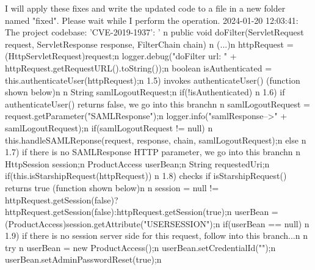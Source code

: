 \markdownRendererUlEndTight \markdownRendererInterblockSeparator
{}I will apply these fixes and write the updated code to a file in a new folder named "fixed". Please wait while I perform the operation. 2024-01-20 12:03:41: The project codebase: \markdownRendererLeftBrace{}'CVE-2019-1937': ' \markdownRendererBackslash{}n public void doFilter(ServletRequest request, ServletResponse response, FilterChain chain) \markdownRendererLeftBrace{}\markdownRendererBackslash{}n (...)\markdownRendererBackslash{}n httpRequest = (HttpServletRequest)request;\markdownRendererBackslash{}n logger.debug("doFilter url: " + httpRequest.getRequestURL().toString());\markdownRendererBackslash{}n boolean isAuthenticated = this.authenticateUser(httpRequest);\markdownRendererBackslash{}n \markdownRendererCircumflex{}\markdownRendererCircumflex{}\markdownRendererCircumflex{} 1.5) invokes authenticateUser() (function shown below)\markdownRendererBackslash{}n \markdownRendererBackslash{}n String samlLogoutRequest;\markdownRendererBackslash{}n if(!isAuthenticated) \markdownRendererLeftBrace{}\markdownRendererBackslash{}n \markdownRendererCircumflex{}\markdownRendererCircumflex{}\markdownRendererCircumflex{} 1.6) if authenticateUser() returns false, we go into this branch\markdownRendererBackslash{}n \markdownRendererBackslash{}n samlLogoutRequest = request.getParameter("SAMLResponse");\markdownRendererBackslash{}n logger.info("samlResponse-->" + samlLogoutRequest);\markdownRendererBackslash{}n if(samlLogoutRequest != null) \markdownRendererLeftBrace{}\markdownRendererBackslash{}n this.handleSAMLReponse(request, response, chain, samlLogoutRequest);\markdownRendererBackslash{}n \markdownRendererRightBrace{} else \markdownRendererLeftBrace{}\markdownRendererBackslash{}n \markdownRendererCircumflex{}\markdownRendererCircumflex{}\markdownRendererCircumflex{} 1.7) if there is no SAMLResponse HTTP parameter, we go into this branch\markdownRendererBackslash{}n \markdownRendererBackslash{}n HttpSession session;\markdownRendererBackslash{}n ProductAccess userBean;\markdownRendererBackslash{}n String requestedUri;\markdownRendererBackslash{}n if(this.isStarshipRequest(httpRequest)) \markdownRendererLeftBrace{}\markdownRendererBackslash{}n \markdownRendererCircumflex{}\markdownRendererCircumflex{}\markdownRendererCircumflex{} 1.8) checks if isStarshipRequest() returns true (function shown below)\markdownRendererBackslash{}n \markdownRendererBackslash{}n session = null != httpRequest.getSession(false)?httpRequest.getSession(false):httpRequest.getSession(true);\markdownRendererBackslash{}n userBean = (ProductAccess)session.getAttribute("USERSESSION");\markdownRendererBackslash{}n if(userBean == null) \markdownRendererLeftBrace{}\markdownRendererBackslash{}n \markdownRendererCircumflex{}\markdownRendererCircumflex{}\markdownRendererCircumflex{} 1.9) if there is no session server side for this request, follow into this branch...\markdownRendererBackslash{}n \markdownRendererBackslash{}n try \markdownRendererLeftBrace{}\markdownRendererBackslash{}n userBean = new ProductAccess();\markdownRendererBackslash{}n userBean.setCredentialId("");\markdownRendererBackslash{}n userBean.setAdminPasswordReset(true);\markdownRendererBackslash{}n 